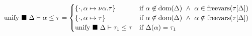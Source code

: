 \documentclass[manuscript]{acmart}
\begin{document}
\[
  \begin{array}{l @{} l}

    \text{unify } \blacksquare\ \Delta \vdash \alpha \leq \tau	
    &{} =
    \begin{cases}  
      \{ \cdot,\alpha \mapsto \nu\alpha.\tau \}
      & \text{if } 
      \alpha \not\in \text{dom}(\Delta) \ \wedge\
      \alpha \in \text{freevars}(\tau[\Delta])
      \\
      \{ \cdot,\alpha \mapsto \tau \}
      & \text{if } 
      \alpha \not\in \text{dom}(\Delta) \ \wedge\
      \alpha \notin \text{freevars}(\tau[\Delta])
      \\
      \text{unify } \blacksquare\ \Delta \vdash \tau_1 \leq \tau
      &\text{if }
      \Delta(\alpha) = \tau_1
    \end{cases}
    \\


\end{array}\]
\end{document}

